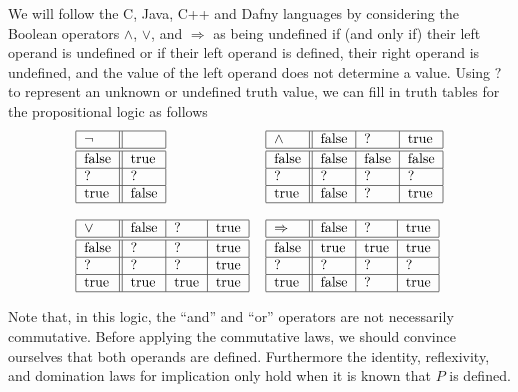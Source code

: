 \documentclass[muchmore,11pt]{article}%
\begin{document}
We will follow the C, Java, C++ and Dafny languages by considering the Boolean operators $\wedge$, $\vee$, and $\Rightarrow$ as being undefined if (and only if) their left operand is undefined or if their left operand is defined, their right operand is undefined, and the value of the left operand does not determine a value.  Using $?$ to represent an unknown or
undefined truth value, we can fill in truth tables for the propositional logic
as follows%
\[
\begin{tabular}[c]{ll}
	\begin{tabular}[c]{|l||l|}\hline
	$\lnot$ & \\\hline\hline
	false & true\\\hline
	? & ?\\\hline
	true & false\\\hline
	\end{tabular}
&
	\begin{tabular}[c]{|l||l|l|l|}\hline
	$\wedge$ & false & ?     & true\\\hline\hline
	false    & false & false & false\\\hline
	?        & ?     & ?     & ?\\\hline
	true     & false & ?     & true\\\hline
	\end{tabular}
\\
\\
	\begin{tabular}[c]{|l||l|l|l|}\hline
	$\vee$ & false & ?    & true\\\hline\hline
	false  & ?     & ?    & true\\\hline
	? & ?  & ?     & true\\\hline
	true   & true  & true & true\\\hline
	\end{tabular}
&
	\begin{tabular}[c]{|l||l|l|l|}\hline
	$\Rightarrow$ & false & ?    & true\\\hline\hline
	false         & true  & true & true\\\hline
	?             & ?     & ?    & ?\\\hline
	true          & false & ?    & true\\\hline
	\end{tabular}
\end{tabular}
\]

Note that, in this logic, the ``and'' and ``or'' operators are not necessarily commutative.  Before applying the commutative laws, we should convince ourselves that both operands are defined. Furthermore the identity, reflexivity, and domination laws for implication only hold when it is known that $P$ is defined.
\end{document}
